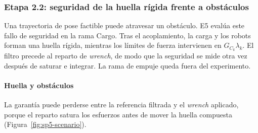 

\subsubsection{Etapa 2.2: seguridad de la huella rígida frente a obstáculos}
\label{subsubsec:sp2-safety}

Una trayectoria de pose factible puede atravesar un obstáculo. E5 evalúa este fallo de seguridad en la rama Cargo. Tras el acoplamiento, la carga y los robots forman una huella rígida, mientras los límites de fuerza intervienen en $G_{C_k}\lambda_k$. El filtro precede al reparto de \emph{wrench}, de modo que la seguridad se mide otra vez después de saturar e integrar. La rama de empuje queda fuera del experimento.

\paragraph{Huella y obstáculos}

La garantía puede perderse entre la referencia filtrada y el \emph{wrench} aplicado, porque el reparto satura los esfuerzos antes de mover la huella compuesta (Figura~\ref{fig:sp5-scenario}).

